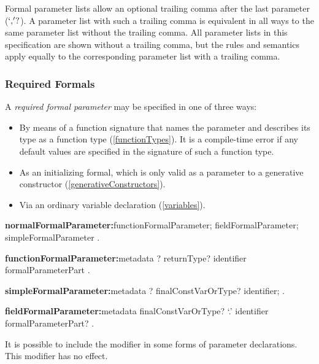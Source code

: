 \documentclass{article}
\begin{document}
Formal parameter lists allow an optional trailing comma after the last parameter ($`,\!'?$).
A parameter list with such a trailing comma is equivalent in all ways to the same parameter list without the trailing comma.
All parameter lists in this specification are shown without a trailing comma, but the rules and semantics apply equally to the corresponding parameter list with a trailing comma.


\subsubsection{Required Formals}

\LMHash{}
A {\em required formal parameter} may be specified in one of three ways:
\begin{itemize}
\item By means of a function signature that names the parameter and describes its type as a function type (\ref{functionTypes}).
It is a compile-time error if any default values are specified in the signature of such a function type.%
\item As an initializing formal, which is only valid as a parameter to a generative constructor (\ref{generativeConstructors}). %
\item Via an ordinary variable declaration (\ref{variables}).
\end{itemize}

\begin{grammar}
{\bf normalFormalParameter:}functionFormalParameter;
  fieldFormalParameter;
  simpleFormalParameter
  .

{\bf functionFormalParameter:}metadata \COVARIANT{}? returnType? identifier
  \gnewline{} formalParameterPart
  .

{\bf simpleFormalParameter:}metadata \COVARIANT{}? finalConstVarOrType? identifier;
  .

{\bf fieldFormalParameter:}metadata finalConstVarOrType? \THIS{} `{\escapegrammar .}' identifier
  \gnewline{} formalParameterPart?
  .
\end{grammar}

\LMHash{}
It is possible to include the modifier \COVARIANT{} in some forms of parameter declarations.
This modifier has no effect.

\end{document}
